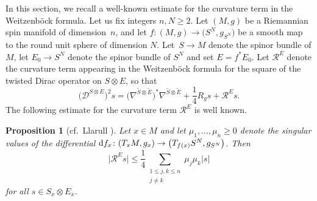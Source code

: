 \documentclass[pdftex]{sigma}
\numberwithin{equation}{section}
\newtheorem{Proposition}[Theorem]{Proposition}
 { \theoremstyle{definition}
\newtheorem{Definition}[Theorem]{Definition}
\newtheorem{Note}[Theorem]{Note}
\newtheorem{Example}[Theorem]{Example}
\newtheorem{Remark}[Theorem]{Remark} }
\begin{document}
In this section, we recall a well-known estimate for the curvature term in the Weitzenb\"ock formula. Let us fix integers $n,N \geq 2$. Let $(M,g)$ be a Riemannian spin manifold of dimension~$n$, and let $f\colon (M,g) \to \big(S^N,g_{S^N}\big)$ be a smooth map to the round unit sphere of dimension $N$. Let~${S \to M}$ denote the spinor bundle of $M$, let $E_0 \to S^N$ denote the spinor bundle of $S^N$ and set $E = f^* E_0$. Let $\mathcal{R}^E$ denote the curvature term appearing in the Weitzenb\"ock formula for the square of the twisted Dirac operator on $S \otimes E$, so that
\[
\big(\mathcal{D}^{S \otimes E }\big)^2 s = \big(\nabla^{\tilde{S} \otimes \tilde{E}}\big)^*\nabla^{\tilde{S} \otimes \tilde{E}} + \frac{1}{4} R_g s + \mathcal{R}^{E} s.
\]
The following estimate for the curvature term $\mathcal{R}^E$ is well known.

\begin{Proposition}[cf.\ Llarull \cite{Llarull}]
\label{curvature.term}
Let $x \in M$ and let $ \mu_1,\hdots,\mu_n \geq 0$ denote the singular values of the differential ${\rm d}f_x\colon (T_x M , g_x) \to \big(T_{f(x)} S^N,g_{S^N}\big)$. Then
\[
 \big|\mathcal{R}^E s\big| \leq \frac{1}{4} \sum_{\substack{1 \leq j,k \leq n\\ j \neq k}} \mu_j \mu_k |s|
\]
for all $s \in S_x \otimes E_x$.
\end{Proposition}
\end{document}
